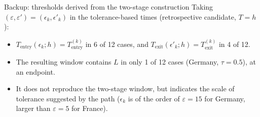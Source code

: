 \documentclass[aspectratio=54,10pt]{beamer}
\begin{document}
\appendix

\begin{frame}{Backup: thresholds derived from the two-stage construction}
\justifying
Taking $(\varepsilon,\varepsilon')=(\epsilon_k,\epsilon'_k)$ in the tolerance-based times
(retrospective candidate, $T=h$):
\begin{itemize}
	\item $T_{\mathrm{entry}}(\epsilon_k;h)=T_{\mathrm{entry}}^{(k)}$ in 6 of 12 cases, and
	$T_{\mathrm{exit}}(\epsilon'_k;h)=T_{\mathrm{exit}}^{(k)}$ in 4 of 12.
	\item The resulting window contains $L$ in only 1 of 12 cases (Germany, $\tau=0.5$), at an endpoint.
	\item It does not reproduce the two-stage window, but indicates the scale of tolerance
	suggested by the path ($\epsilon_k$ is of the order of $\varepsilon=15$ for Germany,
	larger than $\varepsilon=5$ for France).
\end{itemize}
\end{frame}
\end{document}
